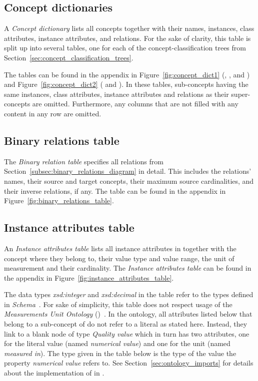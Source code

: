 \subsection{Concept dictionaries}
\label{subsec:concept_dictionaries}

A \emph{Concept dictionary} lists all concepts together with their names, instances, class attributes, instance attributes, and relations. For the sake of clarity, this table is split up into several tables, one for each of the concept-classification trees from Section~\ref{sec:concept_classification_trees}.

The tables can be found in the appendix in Figure~\ref{fig:concept_dict1} (, , and ) and Figure~\ref{fig:concept_dict2} ( and ). In these tables, sub-concepts having the same instances, class attributes, instance attributes and relations as their super-concepts are omitted. Furthermore, any columns that are not filled with any content in any row are omitted.

\subsection{Binary relations table}
\label{subsec:binary_relations_table}

The \emph{Binary relation table} specifies all relations from Section~\ref{subsec:binary_relations_diagram} in detail. This includes the relations' names, their source and target concepts, their maximum source cardinalities, and their inverse relations, if any. The table can be found in the appendix in Figure~\ref{fig:binary_relations_table}.

\subsection{Instance attributes table}
\label{subsec:instance_attributes_table}

An \emph{Instance attributes table} lists all instance attributes in \smarthomeweather together with the concept where they belong to, their value type and value range, the unit of measurement and their cardinality. The \emph{Instance attributes table} can be found in the appendix in Figure~\ref{fig:instance_attributes_table}.

The data types \emph{xsd:integer} and \emph{xsd:decimal} in the table refer to the types defined in \emph{ Schema}~\cite{xml-schema-datatypes}. For sake of simplicity, this table does not respect usage of the \emph{Measurements Unit Ontology} (\muo)~\cite{MUO}. In the ontology, all attributes listed below that belong to a sub-concept of  do not refer to a literal as stated here. Instead, they link to a blank node of type \emph{Quality value} which in turn has two attributes, one for the literal value (named \emph{numerical value}) and one for the unit (named \emph{measured in}). The type given in the table below is the type of the value the property \emph{numerical value} refers to. See Section~\ref{sec:ontology_imports} for details about the implementation of \muo in \smarthomeweather.

